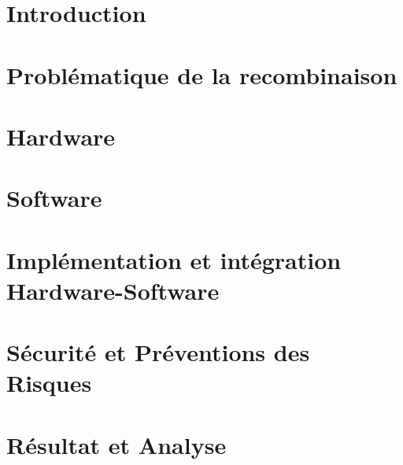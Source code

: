 \documentclass[
    iai, %
    eai, %
]{heig-tb}
\begin{document}
\maketitle
\frontmatter
\clearemptydoublepage

\preamble
\authentification

\begin{abstract}
    
\end{abstract}

\label{glossaire}
\printnoidxglossary
\clearemptydoublepage
{
    \tableofcontents
    \let\cleardoublepage\clearpage
    \listoffigures
    \let\cleardoublepage\clearpage
    \listoftables
    \let\cleardoublepage\clearpage
    \listoflistings
    }
    
\printnomenclature
\clearemptydoublepage
{}

\mainmatter
\chapter{Introduction}


\chapter{Problématique de la recombinaison}

\chapter{Hardware}

\chapter{Software}



\chapter{Implémentation et intégration Hardware-Software}


\chapter{Sécurité et Préventions des Risques}

\chapter{Résultat et Analyse}

\end{document}
